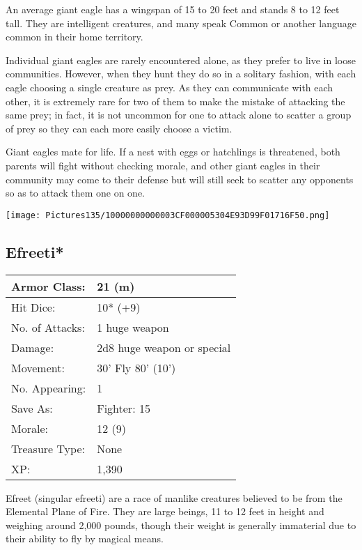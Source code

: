 \documentclass[a4paper,twoside,openany,10pt]{book}
\begin{document}
\begin{multicols}{2}
An average giant eagle has a wingspan of 15 to 20 feet and stands 8 to 12 feet tall. They are intelligent creatures, and many speak Common or another language common in their home territory.

Individual giant eagles are rarely encountered alone, as they prefer to live in loose communities. However, when they hunt they do so in a solitary fashion, with each eagle choosing a single creature as prey. As they can communicate with each other, it is extremely rare for two of them to make the mistake of attacking the same prey; in fact, it is not uncommon for one to attack alone to scatter a group of prey so they can each more easily choose a victim.

Giant eagles mate for life. If a nest with eggs or hatchlings is threatened, both parents will fight without checking morale, and other giant eagles in their community may come to their defense but will still seek to scatter any opponents so as to attack them one on one.

\begin{center}
	\texttt{[image: Pictures135/10000000000003CF000005304E93D99F01716F50.png]}
\end{center}

\subsection*{Efreeti*}\label{efreeti}

\begin{tabularx}{0.48\textwidth}{@{}lX@{}}
Armor Class: & 21 (m) \\\hline
Hit Dice: & 10* (+9) \\\hline
No. of Attacks: & 1 huge weapon \\\hline
Damage: & 2d8 huge weapon or special \\\hline
Movement: & 30' Fly 80'
(10') \\\hline
No. Appearing: & 1 \\\hline
Save As: & Fighter: 15 \\\hline
Morale: & 12 (9) \\\hline
Treasure Type: & None \\\hline
XP: & 1,390 \\\hline
\end{tabularx}\medskip

Efreet (singular efreeti) are a race of manlike creatures believed to be from the Elemental Plane of Fire. They are large beings, 11 to 12 feet in height and weighing around 2,000 pounds, though their weight is generally immaterial due to their ability to fly by magical means.


\end{multicols}
\end{document}

